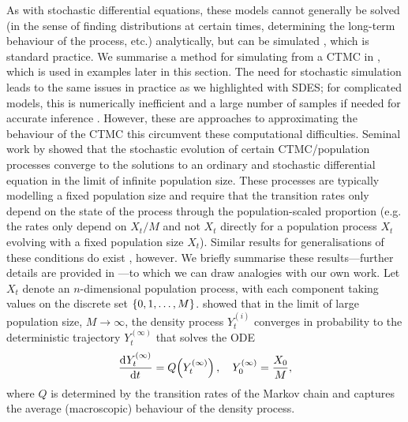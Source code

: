 As with stochastic differential equations, these models cannot generally be solved (in the sense of finding distributions at certain times, determining the long-term behaviour of the process, etc.) analytically, but can be simulated \citep{Gillespie_1977_ExactStochasticSimulation}, which is standard practice.
We summarise a method for simulating from a CTMC in , which is used in examples later in this section.
The need for stochastic simulation leads to the same issues in practice as we highlighted with SDES; for complicated models, this is numerically inefficient and a large number of samples if needed for accurate inference \citehere.
However, these are approaches to approximating the behaviour of the CTMC this circumvent these computational difficulties.
Seminal work by \citet{Kurtz_1970_SolutionsOrdinaryDifferential,Kurtz_1971_LimitTheoremsSequences} showed that the stochastic evolution of certain CTMC/population processes converge to the solutions to an ordinary and stochastic differential equation in the limit of infinite population size.
These processes are typically modelling a fixed population size and require that the transition rates only depend on the state of the process through the population-scaled proportion (e.g. the rates only depend on \(X_t/M\) and not \(X_t\) directly for a population process \(X_t\) evolving with a fixed population size \(X_t\)).
Similar results for generalisations of these conditions do exist \citep{Pollett_1990_ModelInterferenceSearching}, however.
We briefly summarise these results---further details are provided in ---to which we can draw analogies with our own work.
Let \(X_t\) denote an \(n\)-dimensional population process, with each component taking values on the discrete set \(\set{0, 1, \dotsc, M}\).
\citet{Kurtz_1970_SolutionsOrdinaryDifferential} showed that in the limit of large population size, \(M \to \infty\), the density process \(Y_t^{(i)}\) converges in probability to the deterministic trajectory \(Y_t^{(\infty)}\) that solves the ODE \citep{Kurtz_1970_SolutionsOrdinaryDifferential}
\begin{equation}\label{eqn:ctmc_ode}
	\dod{Y_t^{(\infty)}}{t} = Q\!\left(Y_t^{(\infty)}\right), \quad Y_0^{(\infty)} = \frac{X_0}{M},
\end{equation}
where \(Q\) is determined by the transition rates of the Markov chain and captures the average (macroscopic) behaviour of the density process.
